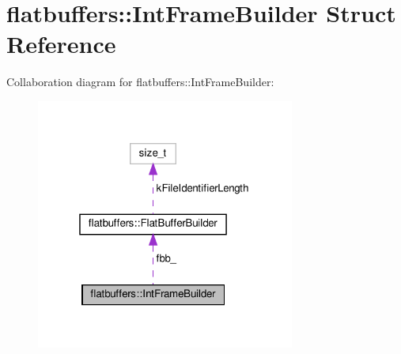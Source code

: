 \hypertarget{structflatbuffers_1_1IntFrameBuilder}{}\section{flatbuffers\+:\+:Int\+Frame\+Builder Struct Reference}
\label{structflatbuffers_1_1IntFrameBuilder}


Collaboration diagram for flatbuffers\+:\+:Int\+Frame\+Builder\+:
\nopagebreak
\begin{figure}[H]
\begin{center}
\leavevmode
\includegraphics[width=241pt]{structflatbuffers_1_1IntFrameBuilder__coll__graph}
\end{center}
\end{figure}
